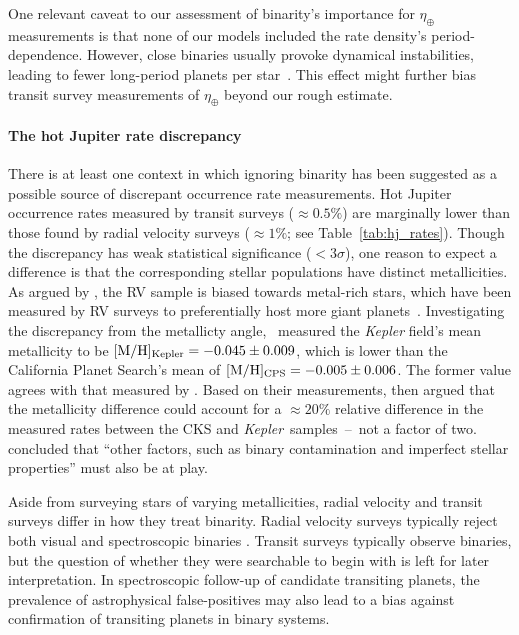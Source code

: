 \documentclass[12pt,modern]{aastex61}
\begin{document}
One relevant caveat to our assessment of binarity's importance for 
$\eta_\oplus$ measurements is that none of our models 
included the rate density's period-dependence. However, close binaries usually
provoke dynamical instabilities, leading to fewer long-period planets per 
star~\citep[\textit{e.g.},][]{holman_long-term_1999,wang_influence_2014,
    kraus_impact_2016}.
This effect might further bias transit survey measurements of $\eta_\oplus$
beyond our rough estimate.


\paragraph{The hot Jupiter rate discrepancy}
There is at least one context in which ignoring binarity has been suggested as 
a possible source of discrepant occurrence rate measurements.
Hot Jupiter occurrence rates measured by transit surveys ($\approx 0.5\%$) are 
marginally lower than those found by radial velocity surveys ($\approx 1\%$; 
see Table~\ref{tab:hj_rates}).
Though the discrepancy has weak statistical significance ($<3\sigma$),
one reason to expect a difference is that the corresponding stellar 
populations have distinct metallicities.
As argued by \citet{gould_frequency_2006}, the RV sample is biased towards 
metal-rich stars, which have been measured by RV surveys to preferentially 
host more giant 
planets~\citep{santos_spectroscopic_2004,fischer_planet-metallicity_2005}.
Investigating the discrepancy from the metallicty 
angle,~\citet{guo_metallicity_2017} measured the
{\it Kepler} field's mean metallicity to be $[{\rm M/H}]_{\rm Kepler}= 
-0.045\pm0.009$, which is lower than the California Planet Search's mean of 
$[{\rm M/H}]_{\rm CPS}= -0.005\pm0.006$.
The former value agrees with that measured by \citet{dong_metallicities_2014}.
Based on their measurements, \citeauthor{guo_metallicity_2017}\! 
then argued that the metallicity difference could account for a $\approx 20\%$ 
relative difference in the measured rates between the CKS and {\it Kepler}\ 
samples~--~not a factor of two.
\citeauthor{guo_metallicity_2017}\! concluded that ``other factors, such as 
binary contamination and imperfect stellar properties'' must also be at play.

Aside from surveying stars of varying metallicities, radial velocity and 
transit surveys differ in how they treat binarity.
Radial velocity surveys typically reject both visual and spectroscopic binaries
\citep[\textit{e.g.},][]{wright_frequency_2012}.
Transit surveys typically observe binaries, but the question of whether they 
were searchable to begin with is left for later interpretation.
In spectroscopic follow-up of candidate transiting planets, the prevalence of 
astrophysical false-positives may also lead to a bias against confirmation of 
transiting planets in binary systems.
\end{document}
